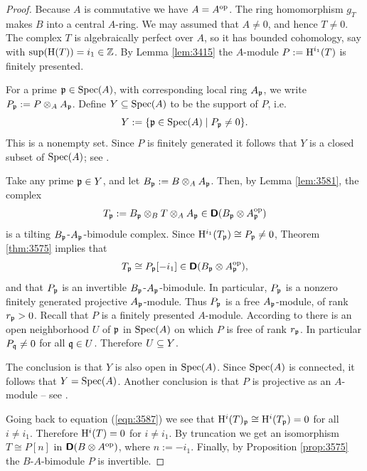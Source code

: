 \begin{proof}
Because $A$ is commutative we have $A = A^{\mathrm{op}}$.
The ring homomorphism $g_T$ makes $B$ into a central $A$-ring. 
We may assumed that $A \neq 0$, and hence $T \neq 0$.
The complex $T$ is algebraically perfect over $A$, 
so it has bounded cohomology, say with 
$\operatorname{sup}(\operatorname{H}(T)) = i_1 \in \mathbb{Z}$.
By Lemma \ref{lem:3415} the $A$-module $P := \operatorname{H}^{i_1}(T)$ is finitely 
presented.

For a prime $\mathfrak{p} \in \operatorname{Spec}(A)$, with corresponding local ring
$A_{\mathfrak{p}}$, we write $P_{\mathfrak{p}} := P \otimes_A A_{\mathfrak{p}}$.
Define $Y \subseteq \operatorname{Spec}(A)$ to be the support of $P$, i.e.\ 
\[ Y := \{ \mathfrak{p} \in \operatorname{Spec}(A) \mid P_{\mathfrak{p}} \neq 0 \} . \]
This is a nonempty set. 
Since $P$ is finitely generated it follows that $Y$ is a closed subset of 
$\operatorname{Spec}(A)$; see \cite[Proposition II.4.17]{Bou}.

Take any prime $\mathfrak{p} \in Y$, and let $B_{\mathfrak{p}} :=  B \otimes_A A_{\mathfrak{p}}$.
Then, by Lemma \ref{lem:3581}, the complex
\[ T_{\mathfrak{p}} := B_{\mathfrak{p}} \otimes_B T \otimes_A A_{\mathfrak{p}} \in 
\boldsymbol{\mathsf{D}}(B_{\mathfrak{p}} \otimes A_{\mathfrak{p}}^{\mathrm{op}}) \]
is a tilting $B_{\mathfrak{p}}$-$A_{\mathfrak{p}}$-bimodule complex. Since
$\mathrm{H}^{i_1}(T_{\mathfrak{p}}) \cong P_{\mathfrak{p}} \neq 0$,
Theorem \ref{thm:3575} implies that 
\begin{equation} \label{eqn:3587}
T_{\mathfrak{p}} \cong P_{\mathfrak{p}}[-i_1] \in \boldsymbol{\mathsf{D}}(B_{\mathfrak{p}} \otimes A_{\mathfrak{p}}^{\mathrm{op}}) ,
\end{equation}
and that $P_{\mathfrak{p}}$ is an invertible $B_{\mathfrak{p}}$-$A_{\mathfrak{p}}$-bimodule. 
In particular, $P_{\mathfrak{p}}$ is a nonzero finitely generated projective 
$A_{\mathfrak{p}}$-module. Thus $P_{\mathfrak{p}}$ is a free $A_{\mathfrak{p}}$-module, of rank 
$r_{\mathfrak{p}} > 0$. Recall that $P$ is a finitely presented $A$-module. 
According to \cite[Section II.5.1,  Corollary]{Bou} there is an 
open neighborhood $U$ of $\mathfrak{p}$ in $\operatorname{Spec}(A)$ on which $P$ is free of rank 
$r_{\mathfrak{p}}$. In particular $P_{\mathfrak{q}} \neq 0$ for all $\mathfrak{q} \in U$.
Therefore $U \subseteq Y$. 

The conclusion is that $Y$ is also open in $\operatorname{Spec}(A)$.
Since $\operatorname{Spec}(A)$ is connected, it follows that 
$Y = \operatorname{Spec}(A)$. Another conclusion is that $P$ is projective as an 
$A$-module -- see \cite[Section II.5.2, Theorem 1]{Bou}.

Going back to equation (\ref{eqn:3587}) we see that 
$\mathrm{H}^i(T)_{\mathfrak{p}} \cong \mathrm{H}^i(T_{\mathfrak{p}}) = 0$
for all $i \neq i_1$. Therefore 
$\mathrm{H}^i(T) = 0$ for $i \neq i_1$. By truncation we get an 
isomorphism $T \cong P[n]$ in 
$\boldsymbol{\mathsf{D}}(B \otimes A^{\mathrm{op}})$,
where $n := -i_1$.
Finally, by Proposition \ref{prop:3575} the $B$-$A$-bimodule $P$ is invertible.
\end{proof}

